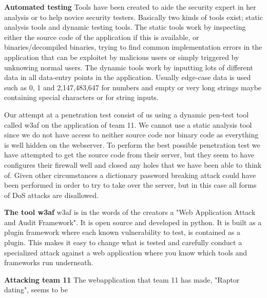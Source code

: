 \documentclass[a4paper]{article}
\begin{document}
\textbf{Automated testing}
Tools have been created to aide the security expert in her analysis or to help novice security testers. Basically two kinds of tools exist; static analysis tools and dynamic testing tools.
The static tools work by inspecting either the source code of the application if this is available, or binaries/decompiled binaries, trying to find common implementation errors in the application that can be exploitet by malicious users or simply triggered by unknowing normal users.
The dynamic tools work by inputting lots of different data in all data-entry points in the application. Usually edge-case data is used such as 0, 1 and 2,147,483,647 for numbers and empty or very long strings maybe containing special characters or for string inputs.

Our attempt at a penetration test consist of us using a dynamic pen-test tool called w3af on the application of team 11.
We cannot use a static analysis tool since we do not have access to neither source code nor binary code as everything is well hidden on the webserver. To perform the best possible penetration test we have attempted to get the source code from their server, but they seem to have configures their firewall well and closed any holes that we have been able to think of. Given other circumstances a dictionary password breaking attack could have been performed in order to try to take over the server, but in this case all forms of DoS attacks are disallowed.

\textbf{The tool w3af}
w3af is in the words of the creators a "Web Application Attack and Audit Framework". It is open source and developed in python. It is built as a plugin framework where each known vulnerability to test, is contained as a plugin. This makes it easy to change what is tested and carefully conduct a specialized attack against a web application where you know which tools and frameworks run underneath.


\textbf{Attacking team 11}
The webapplication that team 11 has made, "Raptor dating", seems to be



\end{document}
